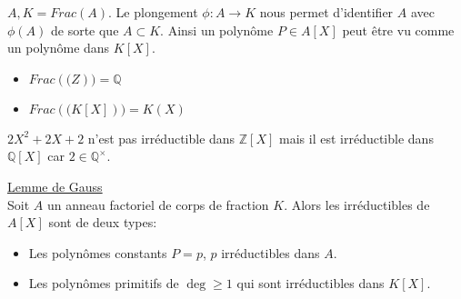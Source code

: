 \begin{remarque}
	$A, K  = Frac(A)$. Le plongement $\phi: A \to K$ nous permet d'identifier $A$ avec $\phi(A)$ de sorte que $A \subset K$.
	Ainsi un polynôme $P \in A[X]$  peut être vu comme un polynôme dans $K[X]$.
\end{remarque}

\begin{example}
	\begin{itemize}
		\item $Frac(\mathbb(Z)) = \mathbb{Q}$
		\item $Frac(\mathbb(K[X])) = K(X)$
	\end{itemize}
\end{example}

\begin{example}
	$2X^2 + 2X +2$ n'est pas irréductible dans $\mathbb{Z}[X]$ mais il est irréductible dans $\mathbb{Q}[X]$ car $2 \in \mathbb{Q}^\times$.
\end{example}



\begin{theorem} \href{https://fr.wikipedia.org/wiki/Lemme_de_Gauss_(polyn%C3%B4mes)#Applications}{Lemme de Gauss}\\
	Soit $A$ un anneau factoriel de corps de fraction $K$.
	Alors les irréductibles de $A[X]$ sont de deux types:
	\begin{itemize}
		\item Les polynômes constants $P = p$,  $p$ irréductibles dans $A$.
		\item Les polynômes primitifs de $\deg \geq 1 $ qui sont irréductibles dans $K[X]$.
	\end{itemize}
\end{theorem}


